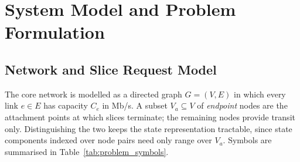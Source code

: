 \documentclass[10pt,journal,comsoc]{IEEEtran}
\begin{document}
\section{System Model and Problem Formulation} \label{model}

\subsection{Network and Slice Request Model}
The core network is modelled as a directed graph $G=(V,E)$ in which every
link $e \in E$ has capacity $C_e$ in Mb/s. A subset $V_a \subseteq V$ of
\emph{endpoint} nodes are the attachment points at which slices terminate;
the remaining nodes provide transit only. Distinguishing the two keeps
the state representation tractable, since state components indexed over
node pairs need only range over $V_a$. Symbols are summarised in
Table~\ref{tab:problem_symbols}.
\end{document}
